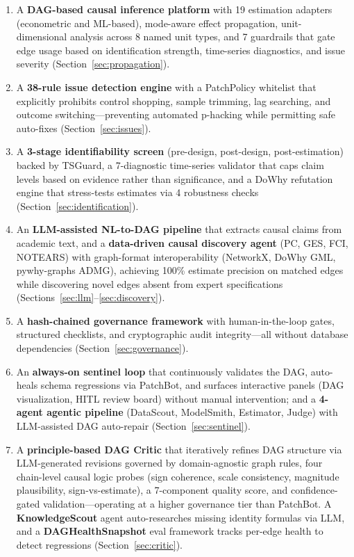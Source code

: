 \documentclass{article}
\begin{document}
\begin{enumerate}[leftmargin=*, itemsep=2pt]
    \item A \textbf{DAG-based causal inference platform} with 19 estimation adapters (econometric and ML-based), mode-aware effect propagation, unit-dimensional analysis across 8 named unit types, and 7 guardrails that gate edge usage based on identification strength, time-series diagnostics, and issue severity (Section~\ref{sec:propagation}).

    \item A \textbf{38-rule issue detection engine} with a PatchPolicy whitelist that explicitly prohibits control shopping, sample trimming, lag searching, and outcome switching---preventing automated p-hacking while permitting safe auto-fixes (Section~\ref{sec:issues}).

    \item A \textbf{3-stage identifiability screen} (pre-design, post-design, post-estimation) backed by TSGuard, a 7-diagnostic time-series validator that caps claim levels based on evidence rather than significance, and a DoWhy refutation engine that stress-tests estimates via 4 robustness checks (Section~\ref{sec:identification}).

    \item An \textbf{LLM-assisted NL-to-DAG pipeline} that extracts causal claims from academic text, and a \textbf{data-driven causal discovery agent} (PC, GES, FCI, NOTEARS) with graph-format interoperability (NetworkX, DoWhy GML, pywhy-graphs ADMG), achieving 100\% estimate precision on matched edges while discovering novel edges absent from expert specifications (Sections~\ref{sec:llm}--\ref{sec:discovery}).

    \item A \textbf{hash-chained governance framework} with human-in-the-loop gates, structured checklists, and cryptographic audit integrity---all without database dependencies (Section~\ref{sec:governance}).

    \item An \textbf{always-on sentinel loop} that continuously validates the DAG, auto-heals schema regressions via PatchBot, and surfaces interactive panels (DAG visualization, HITL review board) without manual intervention; and a \textbf{4-agent agentic pipeline} (DataScout, ModelSmith, Estimator, Judge) with LLM-assisted DAG auto-repair (Section~\ref{sec:sentinel}).

    \item A \textbf{principle-based DAG Critic} that iteratively refines DAG structure via LLM-generated revisions governed by domain-agnostic graph rules, four chain-level causal logic probes (sign coherence, scale consistency, magnitude plausibility, sign-vs-estimate), a 7-component quality score, and confidence-gated validation---operating at a higher governance tier than PatchBot. A \textbf{KnowledgeScout} agent auto-researches missing identity formulas via LLM, and a \textbf{DAGHealthSnapshot} eval framework tracks per-edge health to detect regressions (Section~\ref{sec:critic}).


\end{enumerate}
\end{document}
